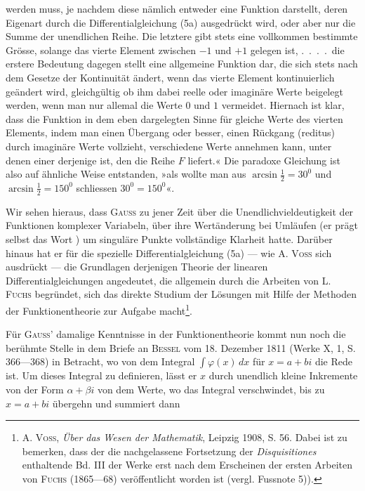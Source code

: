 werden muss, je nachdem diese nämlich entweder eine Funktion darstellt, deren
Eigenart durch die Differentialgleichung (5a) ausgedrückt wird, oder aber nur
die Summe der unendlichen Reihe. Die letztere gibt stets eine vollkommen
bestimmte Grösse, solange das vierte Element zwischen \(-1\) und \(+1\) gelegen
ist, \mbox{.\ .\ .\ .}\ die erstere Bedeutung dagegen stellt eine allgemeine Funktion dar,
die sich stets nach dem Gesetze der Kontinuität ändert, wenn das vierte Element
kontinuierlich geändert wird, gleichgültig ob ihm dabei reelle oder imaginäre
Werte beigelegt werden, wenn man nur allemal die Werte \(0\) und \(1\) vermeidet.
Hiernach ist klar, dass die Funktion in dem eben dargelegten Sinne
für gleiche Werte des vierten Elements, indem man einen Übergang oder
besser, einen Rückgang (reditus) durch imaginäre Werte vollzieht, verschiedene
Werte annehmen kann, unter denen einer derjenige ist, den die Reihe \(F\)
liefert.« Die paradoxe Gleichung ist also auf ähnliche Weise entstanden, »als
wollte man aus \(\arcsin\tfrac12=30^0\) und \(\arcsin\tfrac12=150^0\) schliessen \(30^0=150^0\)«.
\par
Wir sehen hieraus, dass \textsc{Gauss} zu jener Zeit über die Unendlichvieldeutigkeit
der Funktionen komplexer Variabeln, über ihre Wertänderung bei
Umläufen (er prägt selbst das Wort ) um singuläre Punkte vollständige
Klarheit hatte. Darüber hinaus hat er für die spezielle Differentialgleichung
(5a) — wie A. \textsc{Voss} sich ausdrückt — die Grundlagen derjenigen Theorie
der linearen Differentialgleichungen angedeutet, die allgemein durch die Arbeiten
von L. \textsc{Fuchs} begründet, sich das direkte Studium der Lösungen mit
Hilfe der Methoden der Funktionentheorie zur Aufgabe macht\footnote{A. \textsc{Voss}, \textit{Über das Wesen der Mathematik}, Leipzig 1908, S. 56. Dabei ist zu bemerken, dass der die nachgelassene Fortsetzung der \textit{Disquisitiones} enthaltende Bd. III der Werke erst nach dem Erscheinen der ersten Arbeiten von \textsc{Fuchs} (1865—68) veröffentlicht worden ist (vergl. Fussnote 5)).}.
\par
Für \textsc{Gauss'} damalige Kenntnisse in der Funktionentheorie kommt nun
noch die berühmte Stelle in dem Briefe an \textsc{Bessel} vom 18. Dezember 1811
(Werke X, 1, S. 366—368) in Betracht, wo von dem Integral \(\int\varphi(x)\,dx\)
für \(x=a+bi\) die Rede ist. Um dieses Integral zu definieren, lässt er \(x\)
durch unendlich kleine Inkremente von der Form \(\alpha+\beta i\) von dem Werte,
wo das Integral verschwindet, bis zu \(x=a+bi\) übergehn und summiert dann
